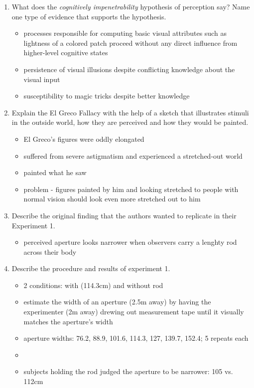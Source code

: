 \documentclass[12pt,english]{scrartcl}
\begin{document}
\begin{enumerate}
 \item What does the \textit{cognitively impenetrability} hypothesis of perception say? Name one type of evidence that supports the hypothesis.

 \color{blue}
 \begin{itemize}
 \item processes responsible for computing basic visual attributes such as lightness of a colored patch proceed without any direct influence from higher-level cognitive states
 \item persistence of visual illusions despite conflicting knowledge about the visual input
 \item susceptibility to magic tricks despite better knowledge
 \end{itemize}
  \color{black}

 \item Explain the El Greco Fallacy with the help of a sketch that illustrates stimuli in the outside world, how they are perceived and how they would be painted.

 \color{blue}
 \begin{itemize}
 \item El Greco's figures were oddly elongated
 \item suffered from severe astigmatism and experienced a stretched-out world
 \item painted what he saw
 \item problem - figures painted by him and looking stretched to people with normal vision should look even more stretched out to him
 \end{itemize}
  \color{black}

 \item Describe the original finding that the authors wanted to replicate in their Experiment 1.

 \color{blue}
 \begin{itemize}
 \item perceived aperture looks narrower when observers carry a lenghty rod across their body
\end{itemize}
  \color{black}

 \item Describe the procedure and results of experiment 1.

 \color{blue}
 \begin{itemize}
 \item 2 conditions: with (114.3cm) and without rod
 \item estimate the width of an aperture (2.5m away) by having the experimenter (2m away) drewing out measurement tape until it visually matches the aperture's width
 \item aperture widths: 76.2, 88.9, 101.6, 114.3, 127, 139.7, 152.4; 5 repeats each
 \item[]
 \item subjects holding the rod judged the aperture to be narrower: 105 vs. 112cm
\end{itemize}
  \color{black}



\end{enumerate}
\end{document}
